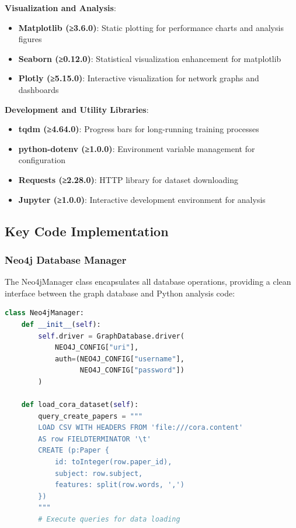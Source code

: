 \documentclass[conference]{IEEEtran}
\begin{document}
\textbf{Visualization and Analysis}:
\begin{itemize}
    \item \textbf{Matplotlib (≥3.6.0)}: Static plotting for performance charts and analysis figures
    \item \textbf{Seaborn (≥0.12.0)}: Statistical visualization enhancement for matplotlib
    \item \textbf{Plotly (≥5.15.0)}: Interactive visualization for network graphs and dashboards
\end{itemize}

\textbf{Development and Utility Libraries}:
\begin{itemize}
    \item \textbf{tqdm (≥4.64.0)}: Progress bars for long-running training processes
    \item \textbf{python-dotenv (≥1.0.0)}: Environment variable management for configuration
    \item \textbf{Requests (≥2.28.0)}: HTTP library for dataset downloading
    \item \textbf{Jupyter (≥1.0.0)}: Interactive development environment for analysis
\end{itemize}

\subsection{Key Code Implementation}

\subsubsection{Neo4j Database Manager}

The Neo4jManager class encapsulates all database operations, providing a clean interface between the graph database and Python analysis code:

\begin{lstlisting}[language=Python, caption=Neo4j Database Manager Implementation]
class Neo4jManager:
    def __init__(self):
        self.driver = GraphDatabase.driver(
            NEO4J_CONFIG["uri"],
            auth=(NEO4J_CONFIG["username"], 
                  NEO4J_CONFIG["password"])
        )
    
    def load_cora_dataset(self):
        query_create_papers = """
        LOAD CSV WITH HEADERS FROM 'file:///cora.content' 
        AS row FIELDTERMINATOR '\t'
        CREATE (p:Paper {
            id: toInteger(row.paper_id),
            subject: row.subject,
            features: split(row.words, ',')
        })
        """
        # Execute queries for data loading
\end{lstlisting}
\end{document}
